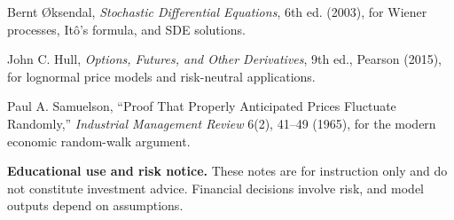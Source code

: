 \documentclass[11pt]{article}
\begin{document}
\begin{readinglist}
  \item Bernt \O ksendal, \emph{Stochastic Differential Equations}, 6th ed. (2003), for Wiener processes, It\^o's formula, and SDE solutions.
  \item John C. Hull, \emph{Options, Futures, and Other Derivatives}, 9th ed., Pearson (2015), for lognormal price models and risk-neutral applications.
  \item Paul A. Samuelson, ``Proof That Properly Anticipated Prices Fluctuate Randomly,'' \emph{Industrial Management Review} 6(2), 41--49 (1965), for the modern economic random-walk argument.
\end{readinglist}

\vfill
{\sffamily\footnotesize\color{vnmuted}\textbf{Educational use and risk notice.} These notes are for instruction only and do not constitute investment advice. Financial decisions involve risk, and model outputs depend on assumptions.}
\end{document}
